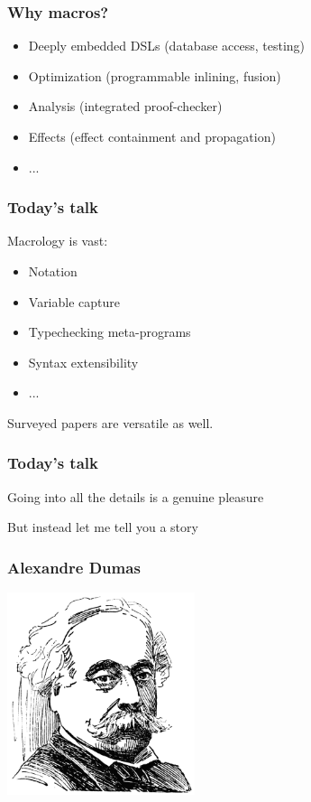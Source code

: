 \documentclass[hyperref={bookmarks=false}]{beamer}
\begin{document}
\begin{frame}[fragile]
\frametitle{Why macros?}
\begin{itemize}
\item Deeply embedded DSLs (database access, testing)
\item Optimization (programmable inlining, fusion)
\item Analysis (integrated proof-checker)
\item Effects (effect containment and propagation)
\item ...
\end{itemize}
\end{frame}

\begin{frame}[fragile]
\frametitle{Today's talk}

Macrology is vast:
\begin{itemize}
\item Notation
\item Variable capture
\item Typechecking meta-programs
\item Syntax extensibility
\item ...
\end{itemize}

\pause
Surveyed papers are versatile as well.
\end{frame}

\begin{frame}[fragile]
\frametitle{Today's talk}

Going into all the details is a genuine pleasure

But instead let me tell you a story
\end{frame}

\begin{frame}[fragile]
\frametitle{Alexandre Dumas}

\begin{center}
\includegraphics[width=5.5cm]{dumas}
\end{center}
\end{frame}
\end{document}
